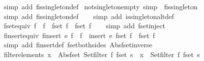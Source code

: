 \begin{isabellebody}
\isamarkupfalse%
\ {\isacharparenleft}simp\ add{\isacharcolon}\ fis{\isacharunderscore}singleton{\isacharunderscore}def{\isacharparenright}%
\endisatagproof
{\isafoldproof}%
%
\isadelimproof
\isanewline
%
\endisadelimproof
\isanewline
{}\isamarkupfalse%
\ not{\isacharunderscore}singleton{\isacharunderscore}empty\ {\isacharbrackleft}simp{\isacharbrackright}{\isacharcolon}\ {\isachardoublequoteopen}{\isasymnot}\ fis{\isacharunderscore}singleton\ {\isacharbraceleft}{\isacharbar}{\isacharbar}{\isacharbraceright}{\isachardoublequoteclose}\isanewline
%
\isadelimproof
\ \ %
\endisadelimproof
%
\isatagproof
{}\isamarkupfalse%
\ {\isacharparenleft}simp\ add{\isacharcolon}\ fis{\isacharunderscore}singleton{\isacharunderscore}def{\isacharparenright}\isanewline
\ \ \isamarkupfalse%
\ {\isacharparenleft}simp\ add{\isacharcolon}\ is{\isacharunderscore}singleton{\isacharunderscore}altdef{\isacharparenright}%
\endisatagproof
{\isafoldproof}%
%
\isadelimproof
\isanewline
%
\endisadelimproof
\isanewline
{}\isamarkupfalse%
\ fset{\isacharunderscore}equiv{\isacharcolon}\ {\isachardoublequoteopen}{\isacharparenleft}f{}\ {\isacharequal}\ f{}{\isacharparenright}\ {\isacharequal}\ {\isacharparenleft}fset\ f{}\ {\isacharequal}\ fset\ f{}{\isacharparenright}{\isachardoublequoteclose}\isanewline
%
\isadelimproof
\ \ %
\endisadelimproof
%
\isatagproof
{}\isamarkupfalse%
\ {\isacharparenleft}simp\ add{\isacharcolon}\ fset{\isacharunderscore}inject{\isacharparenright}%
\endisatagproof
{\isafoldproof}%
%
\isadelimproof
\isanewline
%
\endisadelimproof
\isanewline
{}\isamarkupfalse%
\ finsert{\isacharunderscore}equiv{\isacharcolon}\ {\isachardoublequoteopen}{\isacharparenleft}finsert\ e\ f\ {\isacharequal}\ f{\isacharprime}{\isacharparenright}\ {\isacharequal}\ {\isacharparenleft}insert\ e\ {\isacharparenleft}fset\ f{\isacharparenright}\ {\isacharequal}\ {\isacharparenleft}fset\ f{\isacharprime}{\isacharparenright}{\isacharparenright}{\isachardoublequoteclose}\isanewline
%
\isadelimproof
\ \ %
\endisadelimproof
%
\isatagproof
{}\isamarkupfalse%
\ {\isacharparenleft}simp\ add{\isacharcolon}\ finsert{\isacharunderscore}def\ fset{\isacharunderscore}both{\isacharunderscore}sides\ Abs{\isacharunderscore}fset{\isacharunderscore}inverse{\isacharparenright}%
\endisatagproof
{\isafoldproof}%
%
\isadelimproof
\isanewline
%
\endisadelimproof
\isanewline
{}\isamarkupfalse%
\ filter{\isacharunderscore}elements{\isacharcolon}\ {\isachardoublequoteopen}x\ {\isacharbar}{\isasymin}{\isacharbar}\ Abs{\isacharunderscore}fset\ {\isacharparenleft}Set{\isachardot}filter\ f\ {\isacharparenleft}fset\ s{\isacharparenright}{\isacharparenright}\ {\isacharequal}\ {\isacharparenleft}x\ {\isasymin}\ {\isacharparenleft}Set{\isachardot}filter\ f\ {\isacharparenleft}fset\ s{\isacharparenright}{\isacharparenright}{\isacharparenright}{\isachardoublequoteclose}\isanewline

\end{isabellebody}
